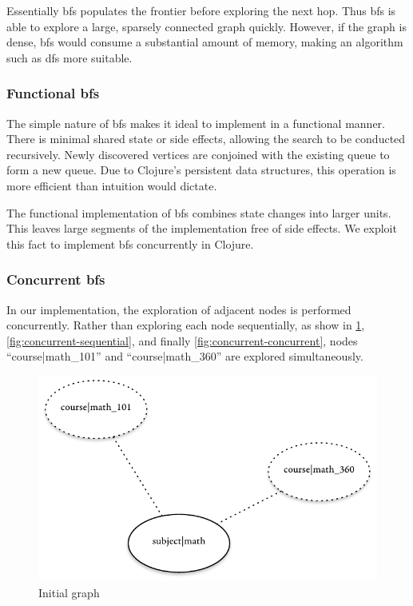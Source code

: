 			Essentially \gls{bfs} populates the frontier before exploring the next hop.  Thus \gls{bfs} is able to explore a large, sparsely connected graph quickly.  However, if the graph is dense, \gls{bfs} would consume a substantial amount of memory, making an algorithm such as \gls{dfs} more suitable.
			
		\subsubsection{Functional \gls{bfs}}
			The simple nature of \gls{bfs} makes it ideal to implement in a functional manner.  There is minimal shared state or side effects, allowing the search to be conducted recursively.  Newly discovered vertices are conjoined with the existing queue to form a new queue.  Due to Clojure's persistent data structures, this operation is more efficient than intuition would dictate.
			
			The functional implementation of \gls{bfs} combines state changes into larger units.  This leaves large segments of the implementation free of side effects.  We exploit this fact to implement \gls{bfs} concurrently in Clojure.
		
		\subsubsection{Concurrent \gls{bfs}}
			In our implementation, the exploration of adjacent nodes is performed concurrently.  Rather than exploring each node sequentially, as show in \cref{fig:concurrent-initial}, \cref{fig:concurrent-sequential}, and finally \cref{fig:concurrent-concurrent}, nodes ``course|math\_101'' and ``course|math\_360'' are explored simultaneously.
			
			\begin{figure}
				\centering
				\includegraphics[scale=0.9]{figures/graphs/concurrent/initial}
				
				\caption{Initial graph}
				\label{fig:concurrent-initial}
			\end{figure}
			
